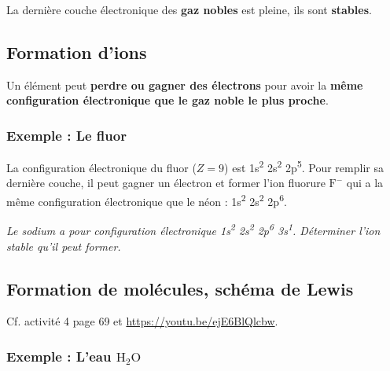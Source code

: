 \documentclass[12pt,a4paper]{article}
\begin{document}
La dernière couche électronique des \textbf{gaz nobles} est pleine, ils sont \textbf{stables}.

\subsection{Formation d'ions}

Un élément peut \textbf{perdre ou gagner des électrons} pour avoir la \textbf{même configuration électronique que le gaz noble le plus proche}.

\subsubsection*{Exemple : Le fluor}
La configuration électronique du fluor ($Z=9$) est 1s\textsuperscript{2} 2s\textsuperscript{2} 2p\textsuperscript{5}.
Pour remplir sa dernière couche, il peut gagner un électron et former l'ion fluorure $\mathrm{F^-}$ qui a la même configuration électronique que le néon : 1s\textsuperscript{2} 2s\textsuperscript{2} 2p\textsuperscript{6}.

\emph{Le sodium a pour configuration électronique 1s\textsuperscript{2} 2s\textsuperscript{2} 2p\textsuperscript{6} 3s\textsuperscript{1}.
Déterminer l'ion stable qu'il peut former.}

\subsection{Formation de molécules, schéma de Lewis}

Cf. activité 4 page 69 et \href{https://youtu.be/ejE6BlQlcbw}{https://youtu.be/ejE6BlQlcbw}.

\noindent
\subsubsection*{Exemple : L'eau $\mathrm{H_2 O}$}

\begin{center}
\end{center}
\end{document}
